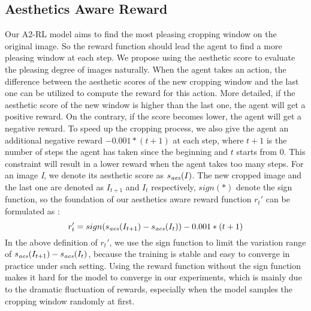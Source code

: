 \documentclass[10pt,twocolumn,letterpaper]{article}
\begin{document}
\subsection{Aesthetics Aware Reward}
\label{reward}
Our A2-RL model aims to find the most pleasing cropping window on the original image. So the reward function should lead the agent to find a more pleasing window at each step. We propose using the aesthetic score to evaluate the pleasing degree of images naturally. When the agent takes an action, the difference between the aesthetic scores of the new cropping window and the last one can be utilized to compute the reward for this action. More detailed, if the aesthetic score of the new window is higher than the last one, the agent will get a positive reward. On the contrary, if the score becomes lower, the agent will get a negative reward. To speed up the cropping process, we also give the agent an additional negative reward $-0.001 * (t + 1)$ at each step, where $t + 1$ is the number of steps the agent has taken since the beginning and $t$ starts from 0. This constraint will result in a lower reward when the agent takes too many steps. For an image \emph{I}, we denote its aesthetic score as $s_{\text{\emph{aes}}}(I)$. The new cropped image and the last one are denoted as $I_{t+1}$ and $I_{t}$ respectively, $sign(*)$ denote the sign function, so the foundation of our aesthetics aware reward function $r_t'$ can be formulated as :
\begin{equation}
 r_t'= sign(s_{\text{\emph{aes}}}(I_{t+1}) - s_{\text{\emph{aes}}}(I_{t})) - 0.001*(t + 1)
\label{imp}
\end{equation}
In the above definition of $r_t'$, we use the sign function to limit the variation range of $s_{\text{\emph{aes}}}(I_{t+1}) - s_{\text{\emph{aes}}}(I_{t})$, because the training is stable and easy to converge in practice under such setting. Using the reward function without the sign function makes it hard for the model to converge in our experiments, which is mainly due to the dramatic fluctuation of rewards, especially when the model samples the cropping window randomly at first.
\end{document}
